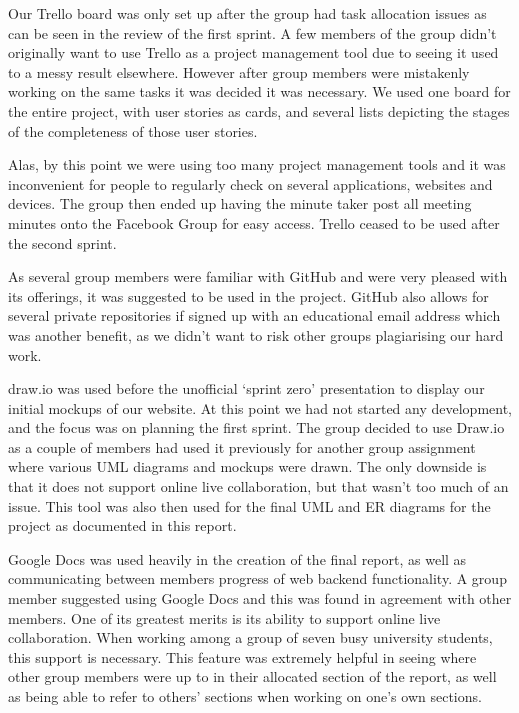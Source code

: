 \documentclass[a4paper,titlepage,12pt]{article}
\begin{document}
Our Trello board was only set up after the group had task allocation issues as
can be seen in the review of the first sprint. A few members of the group
didn't originally want to use Trello as a project management tool due to seeing
it used to a messy result elsewhere. However after group members were
mistakenly working on the same tasks it was decided it was necessary. We used
one board for the entire project, with user stories as cards, and several lists
depicting the stages of the completeness of those user stories.

Alas, by this point we were using too many project management tools and it was
inconvenient for people to regularly check on several applications, websites
and devices. The group then ended up having the minute taker post all meeting
minutes onto the Facebook Group for easy access. Trello ceased to be used after
the second sprint.

As several group members were familiar with GitHub and were very pleased with
its offerings, it was suggested to be used in the project. GitHub also allows
for several private repositories if signed up with an educational email address
which was another benefit, as we didn't want to risk other groups plagiarising
our hard work.

draw.io was used before the unofficial `sprint zero' presentation to display
our initial mockups of our website. At this point we had not started any
development, and the focus was on planning the first sprint. The group decided
to use Draw.io as a couple of members had used it previously for another group
assignment where various UML diagrams and mockups were drawn. The only downside
is that it does not support online live collaboration, but that wasn't too much
of an issue. This tool was also then used for the final UML and ER diagrams for
the project as documented in this report.

Google Docs was used heavily in the creation of the final report, as well as
communicating between members progress of web backend functionality. A group
member suggested using Google Docs and this was found in agreement with other
members. One of its greatest merits is its ability to support online live
collaboration. When working among a group of seven busy university students,
this support is necessary. This feature was extremely helpful in seeing where
other group members were up to in their allocated section of the report, as
well as being able to refer to others' sections when working on one's own
sections.
\end{document}
